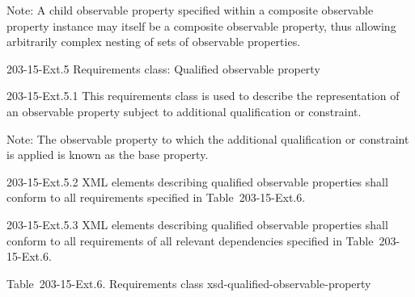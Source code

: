 Note: A child observable property specified within a composite observable property instance may itself be a composite observable property, thus allowing arbitrarily complex nesting of sets of observable properties.

203-15-Ext.5 Requirements class: Qualified observable property

203-15-Ext.5.1 This requirements class is used to describe the representation of an observable property subject to additional qualification or constraint.

Note: The observable property to which the additional qualification or constraint is applied is known as the base property.

203-15-Ext.5.2 XML elements describing qualified observable properties shall conform to all requirements specified in Table~203-15-Ext.6.

203-15-Ext.5.3 XML elements describing qualified observable properties shall conform to all requirements of all relevant dependencies specified in Table~203-15-Ext.6.

Table~203-15-Ext.6. Requirements class xsd-qualified-observable-property

